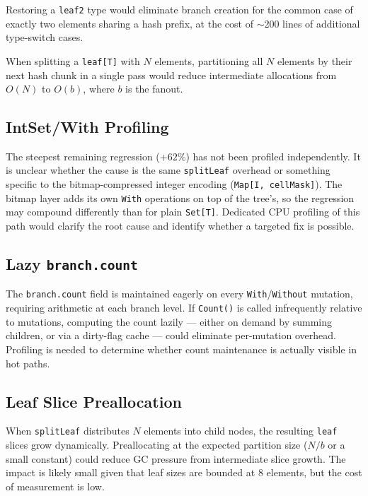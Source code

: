 \documentclass[11pt,twocolumn]{article}
\begin{document}
\begin{description}[nosep,leftmargin=1em]
  \item[Specialized two-element node.] Restoring a \texttt{leaf2} type
    would eliminate branch creation for the common case of exactly two
    elements sharing a hash prefix, at the cost of $\sim$200 lines of
    additional type-switch cases.
  \item[Batch splitting.] When splitting a \texttt{leaf[T]} with $N$
    elements, partitioning all $N$ elements by their next hash chunk in a
    single pass would reduce intermediate allocations from $O(N)$ to
    $O(b)$, where $b$ is the fanout.
\end{description}

\subsection{IntSet/With Profiling}

The steepest remaining regression ($+62\%$) has not been profiled
independently.
It is unclear whether the cause is the same \texttt{splitLeaf} overhead or
something specific to the bitmap-compressed integer encoding
(\texttt{Map[I, cellMask]}).
The bitmap layer adds its own \texttt{With} operations on top of the
tree's, so the regression may compound differently than for plain
\texttt{Set[T]}.
Dedicated CPU profiling of this path would clarify the root cause and
identify whether a targeted fix is possible.

\subsection{Lazy \texttt{branch.count}}

The \texttt{branch.count} field is maintained eagerly on every
\texttt{With}/\texttt{Without} mutation, requiring arithmetic at each
branch level.
If \texttt{Count()} is called infrequently relative to mutations, computing
the count lazily --- either on demand by summing children, or via a
dirty-flag cache --- could eliminate per-mutation overhead.
Profiling is needed to determine whether count maintenance is actually
visible in hot paths.

\subsection{Leaf Slice Preallocation}

When \texttt{splitLeaf} distributes $N$ elements into child nodes, the
resulting \texttt{leaf} slices grow dynamically.
Preallocating at the expected partition size ($N / b$ or a small constant)
could reduce GC pressure from intermediate slice growth.
The impact is likely small given that leaf sizes are bounded at 8 elements,
but the cost of measurement is low.
\end{document}
